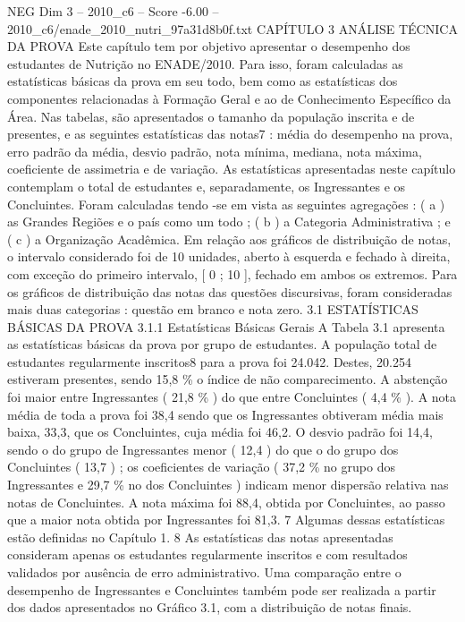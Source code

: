 \begin{textsample}{NEG Dim 3 – 2010\_c6 – Score -6.00 – 2010\_c6/enade\_2010\_nutri\_97a31d8b0f.txt}  \label{ex:f3_neg_017}
CAPÍTULO 3 ANÁLISE TÉCNICA DA PROVA Este capítulo tem por objetivo apresentar o desempenho dos estudantes de Nutrição no ENADE/2010.
Para isso, foram calculadas as estatísticas básicas da prova em seu todo, bem como as estatísticas dos componentes relacionadas à Formação Geral e ao de Conhecimento Específico da Área.
Nas tabelas, são apresentados o tamanho da população inscrita e de presentes, e as seguintes estatísticas das notas7 : média do desempenho na prova, erro padrão da média, desvio padrão, nota mínima, mediana, nota máxima, coeficiente de assimetria e de variação.
As estatísticas apresentadas neste capítulo contemplam o total de estudantes e, separadamente, os Ingressantes e os Concluintes.
Foram calculadas tendo -se em vista as seguintes agregações : ( a ) as Grandes Regiões e o país como um todo ; ( b ) a Categoria Administrativa ; e ( c ) a Organização Acadêmica.
Em relação aos gráficos de distribuição de notas, o intervalo considerado foi de 10 unidades, aberto à esquerda e fechado à direita, com exceção do primeiro intervalo, [ 0 ; 10 ], fechado em ambos os extremos.
Para os gráficos de distribuição das notas das questões discursivas, foram consideradas mais duas categorias : questão em branco e nota zero. 3.1 ESTATÍSTICAS BÁSICAS DA PROVA 3.1.1 Estatísticas Básicas Gerais A Tabela 3.1 apresenta as estatísticas básicas da prova por grupo de estudantes.
A população total de estudantes regularmente inscritos8 para a prova foi 24.042.
Destes, 20.254 estiveram presentes, sendo 15,8 \% o índice de não comparecimento.
A abstenção foi maior entre Ingressantes ( 21,8 \% ) do que entre Concluintes ( 4,4 \% ).
A nota média de toda a prova foi 38,4 sendo que os Ingressantes obtiveram média mais baixa, 33,3, que os Concluintes, cuja média foi 46,2.
O desvio padrão foi 14,4, sendo o do grupo de Ingressantes menor ( 12,4 ) do que o do grupo dos Concluintes ( 13,7 ) ; os coeficientes de variação ( 37,2 \% no grupo dos Ingressantes e 29,7 \% no dos Concluintes ) indicam menor dispersão relativa nas notas de Concluintes.
A nota máxima foi 88,4, obtida por Concluintes, ao passo que a maior nota obtida por Ingressantes foi 81,3. 7 Algumas dessas estatísticas estão definidas no Capítulo 1. 8 As estatísticas das notas apresentadas consideram apenas os estudantes regularmente inscritos e com resultados validados por ausência de erro administrativo.
Uma comparação entre o desempenho de Ingressantes e Concluintes também pode ser realizada a partir dos dados apresentados no Gráfico 3.1, com a distribuição de notas finais.

\end{textsample}
